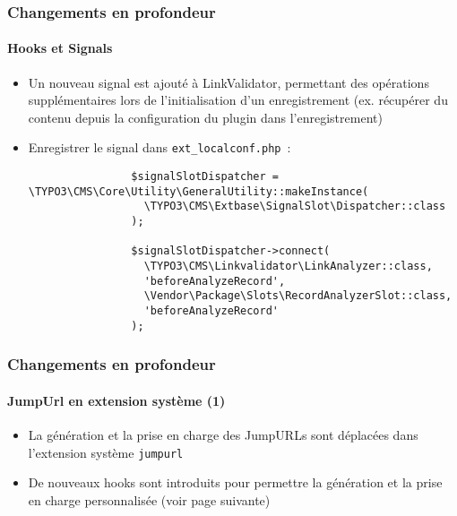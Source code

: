 \begin{frame}[fragile]
	\frametitle{Changements en profondeur}
	\framesubtitle{Hooks et Signals}

	\lstset{basicstyle=\tiny\ttfamily}

	\begin{itemize}

		\item Un nouveau signal est ajouté à LinkValidator, permettant des opérations
			supplémentaires lors de l'initialisation d'un enregistrement\newline
			\small
				(ex. récupérer du contenu depuis la configuration du plugin dans l'enregistrement)
			\normalsize

		\item Enregistrer le signal dans \texttt{ext\_localconf.php}~:

			\begin{lstlisting}
				$signalSlotDispatcher = \TYPO3\CMS\Core\Utility\GeneralUtility::makeInstance(
				  \TYPO3\CMS\Extbase\SignalSlot\Dispatcher::class
				);

				$signalSlotDispatcher->connect(
				  \TYPO3\CMS\Linkvalidator\LinkAnalyzer::class,
				  'beforeAnalyzeRecord',
				  \Vendor\Package\Slots\RecordAnalyzerSlot::class,
				  'beforeAnalyzeRecord'
				);
			\end{lstlisting}

	\end{itemize}

\end{frame}


\begin{frame}[fragile]
	\frametitle{Changements en profondeur}
	\framesubtitle{JumpUrl en extension système (1)}

	\lstset{basicstyle=\tiny\ttfamily}

	\begin{itemize}

		\item La génération et la prise en charge des JumpURLs sont déplacées dans l'extension système \texttt{jumpurl}

		\item De nouveaux hooks sont introduits pour permettre la génération et la prise en charge personnalisée (voir page suivante)

	\end{itemize}

	\breakingchange

\end{frame}

